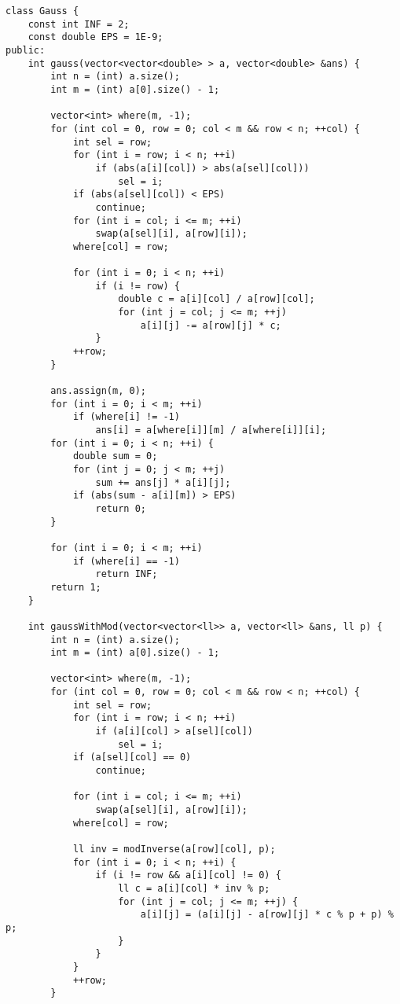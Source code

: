 \begin{lstlisting}[style=cpp]
class Gauss {
    const int INF = 2;
    const double EPS = 1E-9;
public:
    int gauss(vector<vector<double> > a, vector<double> &ans) {
        int n = (int) a.size();
        int m = (int) a[0].size() - 1;

        vector<int> where(m, -1);
        for (int col = 0, row = 0; col < m && row < n; ++col) {
            int sel = row;
            for (int i = row; i < n; ++i)
                if (abs(a[i][col]) > abs(a[sel][col]))
                    sel = i;
            if (abs(a[sel][col]) < EPS)
                continue;
            for (int i = col; i <= m; ++i)
                swap(a[sel][i], a[row][i]);
            where[col] = row;

            for (int i = 0; i < n; ++i)
                if (i != row) {
                    double c = a[i][col] / a[row][col];
                    for (int j = col; j <= m; ++j)
                        a[i][j] -= a[row][j] * c;
                }
            ++row;
        }

        ans.assign(m, 0);
        for (int i = 0; i < m; ++i)
            if (where[i] != -1)
                ans[i] = a[where[i]][m] / a[where[i]][i];
        for (int i = 0; i < n; ++i) {
            double sum = 0;
            for (int j = 0; j < m; ++j)
                sum += ans[j] * a[i][j];
            if (abs(sum - a[i][m]) > EPS)
                return 0;
        }

        for (int i = 0; i < m; ++i)
            if (where[i] == -1)
                return INF;
        return 1;
    }

    int gaussWithMod(vector<vector<ll>> a, vector<ll> &ans, ll p) {
        int n = (int) a.size();
        int m = (int) a[0].size() - 1;

        vector<int> where(m, -1);
        for (int col = 0, row = 0; col < m && row < n; ++col) {
            int sel = row;
            for (int i = row; i < n; ++i)
                if (a[i][col] > a[sel][col])
                    sel = i;
            if (a[sel][col] == 0)
                continue;

            for (int i = col; i <= m; ++i)
                swap(a[sel][i], a[row][i]);
            where[col] = row;

            ll inv = modInverse(a[row][col], p);
            for (int i = 0; i < n; ++i) {
                if (i != row && a[i][col] != 0) {
                    ll c = a[i][col] * inv % p;
                    for (int j = col; j <= m; ++j) {
                        a[i][j] = (a[i][j] - a[row][j] * c % p + p) % p;
                    }
                }
            }
            ++row;
        }


\end{lstlisting}
